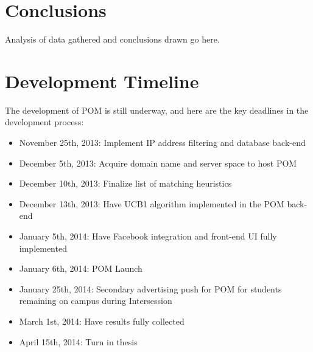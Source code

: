 \documentclass{article}
\begin{document}
\section{Conclusions}

Analysis of data gathered and conclusions drawn go here.

\section{Development Timeline}

The development of POM is still underway, and here are the key deadlines in the development process: 

\begin{itemize}

\item November 25th, 2013: Implement IP address filtering and database back-end
\item December 5th, 2013: Acquire domain name and server space to host POM
\item December 10th, 2013: Finalize list of matching heuristics
\item December 13th, 2013: Have UCB1 algorithm implemented in the POM back-end
\item January 5th, 2014: Have Facebook integration and front-end UI fully implemented
\item January 6th, 2014: POM Launch
\item January 25th, 2014: Secondary advertising push for POM for students remaining on campus during Intersession
\item March 1st, 2014: Have results fully collected
\item April 15th, 2014: Turn in thesis

\end{itemize}



\end{document}
